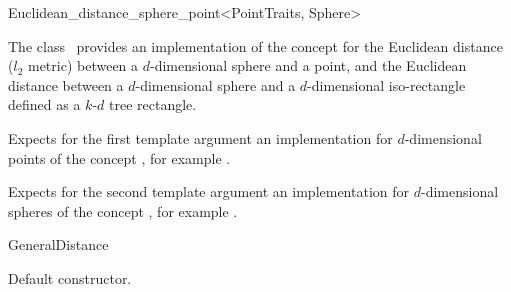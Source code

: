 

\begin{ccRefClass}{Euclidean_distance_sphere_point<PointTraits, Sphere>}  %


\ccDefinition
  
The class \ccRefName\ provides an implementation of the
 concept for the Euclidean distance ($l_2$
metric) between a $d$-dimensional sphere and a point, and the
Euclidean distance between a $d$-dimensional sphere and a
$d$-dimensional iso-rectangle defined as a $k$-$d$ tree rectangle.



\ccParameters
Expects for the first template argument
an implementation for
$d$-dimensional points of
the concept , 
for example .

Expects for the second template argument an implementation 
for $d$-dimensional spheres of the concept ,
for example .


\ccIsModel

GeneralDistance

\ccTypes



\ccCreation
{}  %


{Default constructor.}

\ccOperations



\end{ccRefClass}
